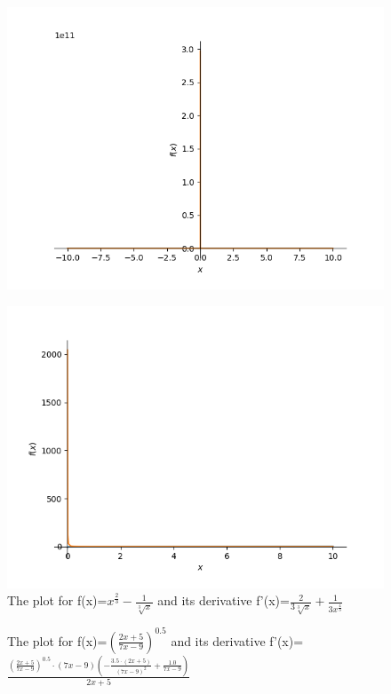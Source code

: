 \documentclass{article}
\begin{document}
\begin{figure}
\includegraphics{plot_24}
\end{figure}\begin{figure}
\caption{The plot for f(x)=$x^{\frac{2}{3}} - \frac{1}{\sqrt[3]{x}}$ and its derivative f'(x)=$\frac{2}{3 \sqrt[3]{x}} + \frac{1}{3 x^{\frac{4}{3}}}$}
\centering
\includegraphics{plot_25}
\end{figure}\begin{figure}
\caption{The plot for f(x)=$\left(\frac{2 x + 5}{7 x - 9}\right)^{0.5}$ and its derivative f'(x)=$\frac{\left(\frac{2 x + 5}{7 x - 9}\right)^{0.5} \cdot \left(7 x - 9\right) \left(- \frac{3.5 \cdot \left(2 x + 5\right)}{\left(7 x - 9\right)^{2}} + \frac{1.0}{7 x - 9}\right)}{2 x + 5}$}
\centering

\end{figure}
\end{document}
